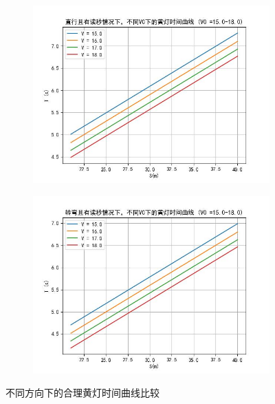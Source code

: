 \documentclass[withoutpreface,bwprint]{cumcmthesis}
\begin{document}
\begin{figure}[htbp!]
\begin{subfigure}[t]{0.45\textwidth}
		\centering
		\includegraphics[width=\textwidth]{pics/Time_Curve_V0_WCT_STR18.0}
		\label{fig:str2}
	\end{subfigure}
	\hfill
	\begin{subfigure}[t]{0.45\textwidth}
		\centering
		\includegraphics[width=\textwidth]{pics/Time_Curve_V0_WCT_Turn18.0} %
		\label{fig:Turn2}
	\end{subfigure}
	\caption{不同方向下的合理黄灯时间曲线比较}
	\label{fig:T5}
\end{figure}
\end{document}
